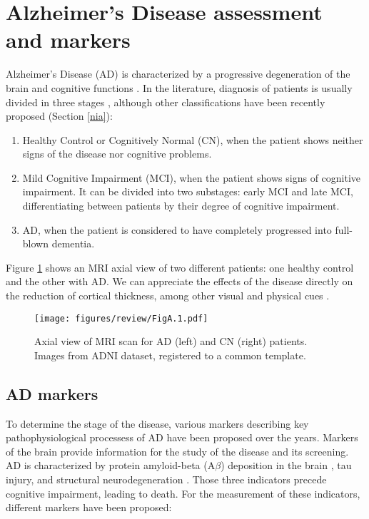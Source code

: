 
\section{Alzheimer's Disease assessment and markers}
\label{biomarkers}

Alzheimer's Disease (AD) is characterized by a progressive degeneration of the brain and cognitive functions \cite{Lane2018}. In the literature, diagnosis of patients is usually divided in three stages \cite{Brookmeyer2007}, although other classifications have been recently proposed (Section \ref{nia}):

\begin{enumerate}\itemsep5pt
\item Healthy Control or Cognitively Normal (CN), when the patient shows neither signs of the disease nor cognitive problems.
\item Mild Cognitive Impairment (MCI), when the patient shows signs of cognitive impairment. It can be divided into two substages: early MCI and late MCI, differentiating between patients by their degree of cognitive impairment.
\item AD, when the patient is considered to have completely progressed into full-blown dementia.
\end{enumerate}

Figure \ref{appendix:figAD} shows an MRI axial view of two different patients: one healthy control and the other with AD. We can appreciate the effects of the disease directly on the reduction of cortical thickness, among other visual and physical cues \cite{Schmidt1992}. \\

\begin{figure}[htbp]
  \centering
  \texttt{[image: figures/review/FigA.1.pdf]}
  \caption{Axial view of MRI scan for AD (left) and CN (right) patients. Images from ADNI dataset, registered to a common template.}
  \label{appendix:figAD}
\end{figure}

\subsection*{AD markers} 

To determine the stage of the disease, various markers describing key pathophysiological processess of AD have been proposed over the years. Markers of the brain provide information for the study of the disease and its screening. AD is characterized by protein amyloid-beta (A$\beta$) deposition in the brain \cite{Rissman2012}, tau injury, and structural neurodegeneration \cite{Jack2013}. Those three indicators precede cognitive impairment, leading to death. For the measurement of these indicators, different markers have been proposed:

